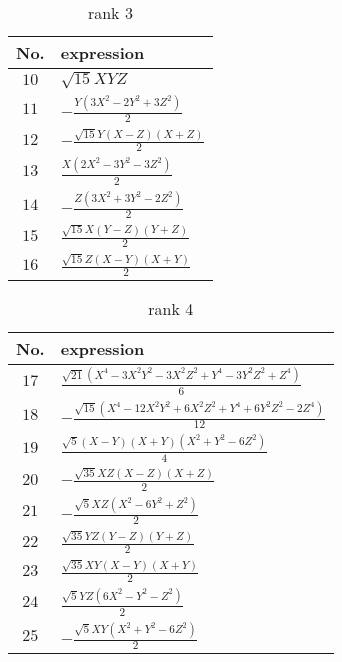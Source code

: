 \documentclass[fleqn,8pt,landscape]{jsarticle}
\begin{document}
\begin{table}[ht!]
\begin{center}
\caption{rank 3}
\renewcommand{\arraystretch}{1.3}
\begin{tabular}{cl} \hline \hline
No. & expression \\ \hline
$ 10 $ & $ \sqrt{15} X Y Z $ \\
$ 11 $ & $ - \frac{Y \left(3 X^{2} - 2 Y^{2} + 3 Z^{2}\right)}{2} $ \\
$ 12 $ & $ - \frac{\sqrt{15} Y \left(X - Z\right) \left(X + Z\right)}{2} $ \\
$ 13 $ & $ \frac{X \left(2 X^{2} - 3 Y^{2} - 3 Z^{2}\right)}{2} $ \\
$ 14 $ & $ - \frac{Z \left(3 X^{2} + 3 Y^{2} - 2 Z^{2}\right)}{2} $ \\
$ 15 $ & $ \frac{\sqrt{15} X \left(Y - Z\right) \left(Y + Z\right)}{2} $ \\
$ 16 $ & $ \frac{\sqrt{15} Z \left(X - Y\right) \left(X + Y\right)}{2} $ \\
 \hline \hline
\end{tabular}
\end{center}
\end{table}
\begin{table}[ht!]
\begin{center}
\caption{rank 4}
\renewcommand{\arraystretch}{1.3}
\begin{tabular}{cl} \hline \hline
No. & expression \\ \hline
$ 17 $ & $ \frac{\sqrt{21} \left(X^{4} - 3 X^{2} Y^{2} - 3 X^{2} Z^{2} + Y^{4} - 3 Y^{2} Z^{2} + Z^{4}\right)}{6} $ \\
$ 18 $ & $ - \frac{\sqrt{15} \left(X^{4} - 12 X^{2} Y^{2} + 6 X^{2} Z^{2} + Y^{4} + 6 Y^{2} Z^{2} - 2 Z^{4}\right)}{12} $ \\
$ 19 $ & $ \frac{\sqrt{5} \left(X - Y\right) \left(X + Y\right) \left(X^{2} + Y^{2} - 6 Z^{2}\right)}{4} $ \\
$ 20 $ & $ - \frac{\sqrt{35} X Z \left(X - Z\right) \left(X + Z\right)}{2} $ \\
$ 21 $ & $ - \frac{\sqrt{5} X Z \left(X^{2} - 6 Y^{2} + Z^{2}\right)}{2} $ \\
$ 22 $ & $ \frac{\sqrt{35} Y Z \left(Y - Z\right) \left(Y + Z\right)}{2} $ \\
$ 23 $ & $ \frac{\sqrt{35} X Y \left(X - Y\right) \left(X + Y\right)}{2} $ \\
$ 24 $ & $ \frac{\sqrt{5} Y Z \left(6 X^{2} - Y^{2} - Z^{2}\right)}{2} $ \\
$ 25 $ & $ - \frac{\sqrt{5} X Y \left(X^{2} + Y^{2} - 6 Z^{2}\right)}{2} $ \\
 \hline \hline
\end{tabular}
\end{center}
\end{table}
\end{document}
